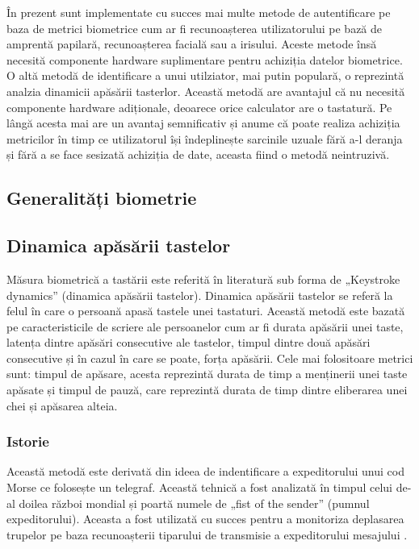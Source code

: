 \documentclass[9pt,shortpaper,twoside,web]{ieeecolor}
\begin{document}
	În prezent sunt implementate cu succes mai multe metode de autentificare pe baza de metrici biometrice cum ar fi recunoașterea utilizatorului pe bază de amprentă papilară, recunoașterea facială sau a irisului. Aceste metode însă necesită componente hardware suplimentare pentru achiziția datelor biometrice. O altă metodă de identificare a unui utilziator, mai putin populară, o reprezintă analzia dinamicii apăsării tasterlor. Această metodă are avantajul că nu necesită componente hardware adiționale, deoarece orice calculator are o tastatură. Pe lângă acesta mai are un avantaj semnificativ și anume că poate realiza achiziția metricilor în timp ce utilizatorul își îndeplinește sarcinile uzuale fără a-l deranja și fără a se face sesizată achiziția de date, aceasta fiind o metodă neintruzivă.


\subsection{Generalități biometrie}


\subsection{Dinamica apăsării tastelor}
	Măsura biometrică a tastării este referită în literatură sub forma de „Keystroke dynamics” (dinamica apăsării tastelor). Dinamica apăsării tastelor se referă la felul în care o persoană apasă tastele unei tastaturi. Această metodă este bazată pe caracteristicile de scriere ale persoanelor cum ar fi durata apăsării unei taste, latența dintre apăsări consecutive ale tastelor, timpul dintre două apăsări consecutive și în cazul în care se poate, forța apăsării. Cele mai folositoare metrici sunt: timpul de apăsare, acesta reprezintă durata de timp a menținerii unei taste apăsate și timpul de pauză, care reprezintă durata de timp dintre eliberarea unei chei și apăsarea alteia.


\subsubsection{Istorie}	
	Această metodă este derivată din ideea de indentificare a expeditorului unui cod Morse ce folosește un telegraf. Această tehnică a fost analizată în timpul celui de-al doilea război mondial și poartă numele de „fist of the sender” (pumnul expeditorului). Aceasta a fost utilizată cu succes pentru a monitoriza deplasarea trupelor pe baza recunoașterii tiparului de transmisie a expeditorului mesajului \cite{b2}.
\end{document}
